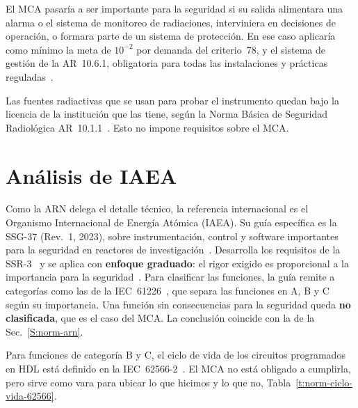 El MCA pasaría a ser importante para la seguridad si su salida alimentara una
alarma o el sistema de monitoreo de radiaciones, interviniera en decisiones de
operación, o formara parte de un sistema de protección. En ese caso aplicaría
como mínimo la meta de $10^{-2}$ por demanda del criterio~78, y el sistema de
gestión de la AR~10.6.1, obligatoria para todas las instalaciones y prácticas
reguladas~\cite{ARN_AR1061}.

Las fuentes radiactivas que se usan para probar el instrumento quedan bajo la
licencia de la institución que las tiene, según la Norma Básica de Seguridad
Radiológica AR~10.1.1~\cite{ARN_AR1011}. Esto no impone requisitos sobre el MCA.

\section{Análisis de IAEA}
\label{S:norm-iaea}

Como la ARN delega el detalle técnico, la referencia internacional es el
Organismo Internacional de Energía Atómica (IAEA). Su guía específica es la
SSG-37 (Rev.~1, 2023), sobre instrumentación, control y software importantes
para la seguridad en reactores de investigación~\cite{IAEA_SSG37}. Desarrolla
los requisitos de la SSR-3~\cite{IAEA_SSR3} y se aplica con \textbf{enfoque
graduado}: el rigor exigido es proporcional a la importancia para la
seguridad~\cite{IAEA_SSG22}. Para clasificar las funciones, la guía remite a
categorías como las de la IEC~61226~\cite{IEC61226}, que separa las funciones
en A, B y C según su importancia. Una función sin consecuencias para la
seguridad queda \textbf{no clasificada}, que es el caso del MCA. La conclusión
coincide con la de la Sec.~\ref{S:norm-arn}.

Para funciones de categoría B y C, el ciclo de vida de los circuitos programados
en HDL está definido en la IEC~62566-2~\cite{IEC62566-2}. El MCA no está
obligado a cumplirla, pero sirve como vara para ubicar lo que hicimos y lo que
no, Tabla~\ref{t:norm-ciclo-vida-62566}.

